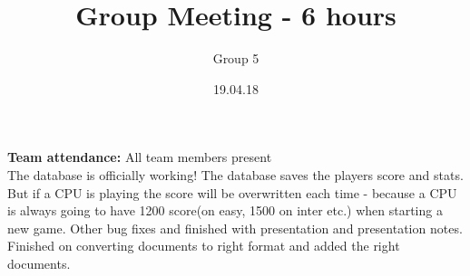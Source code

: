 \documentclass{article}
\title{Group Meeting - 6 hours}
\author{Group 5}
\date{19.04.18}
\begin{document}
	\maketitle
	\noindent
	\textbf{Team attendance:} All team members present  \\

	\noindent
The database is officially working! The database saves the players score and stats. But if a CPU is playing
the score will be overwritten each time - because a CPU is always going to have 1200 score(on easy, 1500 on inter etc.) when starting a new game.
Other bug fixes and finished with presentation and presentation notes. Finished on converting documents to right format
and added the right documents.
\end{document}

